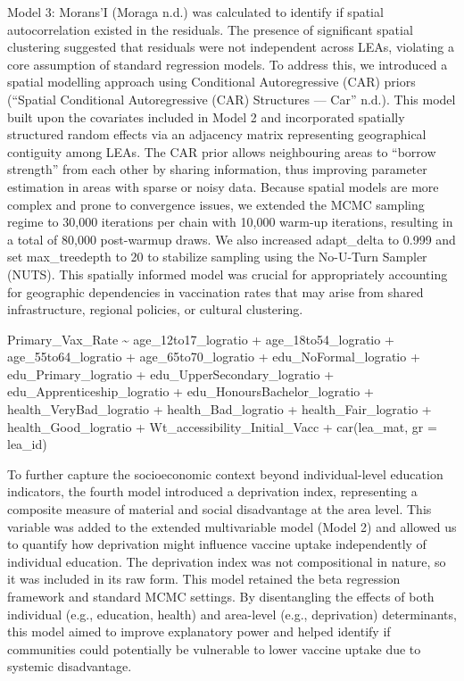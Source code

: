 \documentclass{article}
\begin{document}
Model 3: Morans'I (Moraga n.d.) was calculated to identify if spatial
autocorrelation existed in the residuals. The presence of significant
spatial clustering suggested that residuals were not independent across
LEAs, violating a core assumption of standard regression models. To
address this, we introduced a spatial modelling approach using
Conditional Autoregressive (CAR) priors ({``Spatial Conditional
Autoregressive ({CAR}) Structures --- Car''} n.d.). This model built
upon the covariates included in Model 2 and incorporated spatially
structured random effects via an adjacency matrix representing
geographical contiguity among LEAs. The CAR prior allows neighbouring
areas to ``borrow strength'' from each other by sharing information,
thus improving parameter estimation in areas with sparse or noisy data.
Because spatial models are more complex and prone to convergence issues,
we extended the MCMC sampling regime to 30,000 iterations per chain with
10,000 warm-up iterations, resulting in a total of 80,000 post-warmup
draws. We also increased adapt\_delta to 0.999 and set max\_treedepth to
20 to stabilize sampling using the No-U-Turn Sampler (NUTS). This
spatially informed model was crucial for appropriately accounting for
geographic dependencies in vaccination rates that may arise from shared
infrastructure, regional policies, or cultural clustering.

Primary\_Vax\_Rate \textasciitilde{} age\_12to17\_logratio +
age\_18to54\_logratio + age\_55to64\_logratio + age\_65to70\_logratio +
edu\_NoFormal\_logratio + edu\_Primary\_logratio +
edu\_UpperSecondary\_logratio + edu\_Apprenticeship\_logratio +
edu\_HonoursBachelor\_logratio + health\_VeryBad\_logratio +
health\_Bad\_logratio + health\_Fair\_logratio + health\_Good\_logratio
+ Wt\_accessibility\_Initial\_Vacc + car(lea\_mat, gr = lea\_id)

To further capture the socioeconomic context beyond individual-level
education indicators, the fourth model introduced a deprivation index,
representing a composite measure of material and social disadvantage at
the area level. This variable was added to the extended multivariable
model (Model 2) and allowed us to quantify how deprivation might
influence vaccine uptake independently of individual education. The
deprivation index was not compositional in nature, so it was included in
its raw form. This model retained the beta regression framework and
standard MCMC settings. By disentangling the effects of both individual
(e.g., education, health) and area-level (e.g., deprivation)
determinants, this model aimed to improve explanatory power and helped
identify if communities could potentially be vulnerable to lower vaccine
uptake due to systemic disadvantage.
\end{document}
